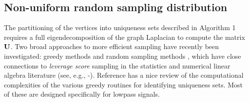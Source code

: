 \documentclass[journal, 10pt]{IEEEtran}
\begin{document}







\subsection{Non-uniform random sampling distribution}
The partitioning of the vertices into uniqueness sets described in Algorithm 1 requires a full eigendecomposition of the graph Laplacian to compute the matrix ${\bf U}$. Two broad approaches to more efficient sampling have recently been investigated: greedy methods \cite{chen2015discrete,anis2014towards,tsitsvero2016uncertainty,anis2016efficient} and random sampling methods \cite{shomorony,PuyTGV15,chen2016signal}, which have close connections to \emph{leverage score} sampling in the statistics and numerical linear algebra literature (see, e.g., \cite{drineas2012fast}\nocite{mahoney2009cur,boutsidis2009improved}-\cite{mahoney2011randomized}). Reference \cite{anis2016efficient} has a nice review of the computational complexities of the various greedy routines for identifying uniqueness sets. Most of these are designed specifically for lowpass signals. 
 
\end{document}
